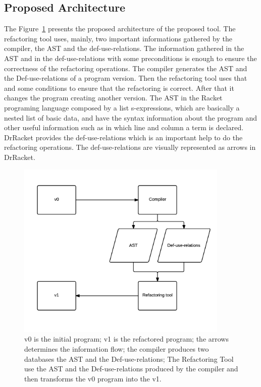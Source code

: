 \subsection{Proposed Architecture}

The Figure~\ref{fig:architecture} presents the proposed architecture of the proposed tool. 
The refactoring tool uses, mainly, two important informations gathered by the compiler, the AST and the def-use-relations.
The information gathered in the AST and in the def-use-relations with some preconditions is enough to ensure the correctness of the refactoring operations.
The compiler generates the AST and the Def-use-relations of a program version. Then the refactoring tool uses that and some conditions to ensure that the refactoring is correct. After that it changes the program creating another version.
The AST in the Racket programing language composed by a list s-expressions, which are basically a nested list of basic data, and have the syntax information about the program and other useful information such as in which line and column a term is declared.
DrRacket provides the def-use-relations which is an important help to do the refactoring operations. The def-use-relations are visually represented as arrows in DrRacket.

\begin{figure}[htbp]
	\centering
	\includegraphics[width=0.9\textwidth]{img/arquitectura.png}
	\caption{v0 is the initial program; v1 is the refactored program; the arrows determines the information flow; the compiler produces two databases the AST and the Def-use-relations; The Refactoring Tool use the AST and the Def-use-relations produced by the compiler and then transforms the v0 program into the v1.}
	\label{fig:architecture}
\end{figure}


